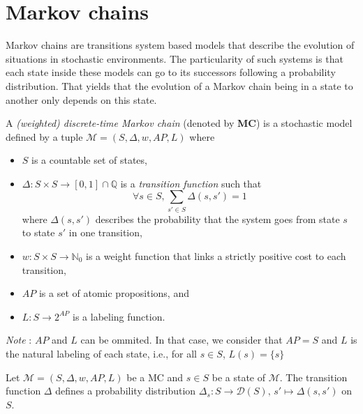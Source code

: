\section{Markov chains}
Markov chains are transitions system based models that describe the evolution of situations in stochastic environments. The particularity of such systems is that each state inside these models can go to its successors following a probability distribution. That yields that the evolution of a Markov chain being in a state to another only depends on this state.
\begin{definition}
  A \textit{(weighted) discrete-time Markov chain} (denoted by \textbf{MC}) is a stochastic model defined by a tuple $\mathcal{M}=(S, \Delta, w, AP, L)$ where
	\begin{itemize}
		\item $S$ is a countable set of states,
		\item $\Delta: S \times S \rightarrow [0,1] \cap \mathbb{Q}$ is a  \textit{transition function} such that \[\forall s \in S, \sum_{s' \in S}\Delta(s, s')= 1\]
		where $\Delta(s, s')$ describes the probability that the system goes from state $s$ to state $s'$ in one transition,
    \item $w : S \times S \rightarrow \mathbb{N}_0$ %
      is a weight function that links a strictly positive cost to each transition,
    \item $AP$ is a set of atomic propositions, and
    \item $L : S \rightarrow 2^{AP}$ is a labeling function.
	\end{itemize}
  \textit{Note }: $AP$ and $L$ can be ommited. In that case, we consider that $AP = S$ and $L$ is the natural labeling of each state, i.e., for all $s \in S$, $L(s) = \{s\}$
\end{definition}

\begin{property}
  Let $\mathcal{M} = (S, \Delta, w, AP, L)$ be a MC and $s \in S$ be a state of $\mathcal{M}$. The transition function $\Delta$ defines a probability distribution $\Delta_s : S \rightarrow \mathcal{D}(S), \, s' \mapsto \Delta(s, s')$ on $S$.
\end{property}

